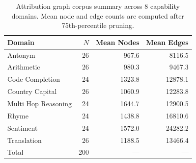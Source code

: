 \begin{table}[t]
\centering
\caption{Attribution graph corpus summary across 8 capability domains. Mean node and edge counts are computed after 75th-percentile pruning.}
\label{table:corpus}
\begin{tabular}{lrrr}
\toprule
Domain & $N$ & Mean Nodes & Mean Edges \\
\midrule
    Antonym                   &  26 &      967.6 &     8116.5 \\
    Arithmetic                &  26 &      980.3 &     9467.3 \\
    Code Completion           &  24 &     1323.8 &    12878.1 \\
    Country Capital           &  26 &     1060.9 &    12283.8 \\
    Multi Hop Reasoning       &  24 &     1644.7 &    12900.5 \\
    Rhyme                     &  24 &     1438.8 &    16810.6 \\
    Sentiment                 &  24 &     1572.0 &    24282.2 \\
    Translation               &  26 &     1188.5 &    13466.4 \\
\midrule
    Total                     & 200 & --- & --- \\
\bottomrule
\end{tabular}
\end{table}